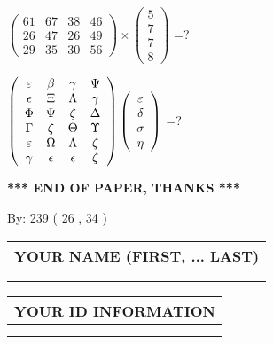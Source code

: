 \documentclass[12pt]{article}
\begin{document}
  
 
$ \left( \begin{array}{ccccccccc}
 61  & 
 67  & 
 38  & 
 46  \\ 
 26  & 
 47  & 
 26  & 
 49  \\ 
 29  & 
 35  & 
 30  & 
 56
\end{array}\right) \times
\left( \begin{array}{c}
 5  \\ 
 7  \\ 
 7  \\ 
 8
\end{array}\right) $ =?
 
 
$  %
 \left( \begin{array}
 {
 c
 c
 c
 c
 }
 \varepsilon & 
 \beta & 
 \gamma & 
 \Psi \\ 
 \epsilon & 
                    \Xi & 
 \Lambda & 
 \gamma \\ 
 \Phi & 
 \Psi & 
                    \zeta & 
 \Delta \\ 
 \Gamma & 
                    \zeta & 
 \Theta & 
 \Upsilon \\ 
 \varepsilon & 
 \Omega & 
 \Lambda & 
                    \zeta \\ 
 \gamma & 
 \epsilon & 
 \epsilon & 
                    \zeta
 \end{array} \right)
 \left( \begin{array}
 {
 c
 }
 \varepsilon \\ 
 \delta \\ 
 \sigma \\ 
 \eta
 \end{array} \right)
$ =?
 

 

 
\vspace{0.3in}
   
   
 \vspace{0.2in}
 
   
   
   
   
\vspace{1.0in} 
{\textbf{\large{ *** END OF PAPER, THANKS *** }}} 
   
   
\hspace{1.0in} By: 
 239 ( 26 ,  34 )
   
   
   
   
\newpage 
\setcounter{page}{ 
    27001 } 
   
   
   
   
\noindent\begin{tabular}{|l|}
\hline
YOUR NAME (FIRST, ... LAST)  \\
\hline
 \\ 
 \\ 
\hline
\end{tabular}
\hspace{0.05in} \begin{tabular}{|l|}
\hline
 YOUR   ID   INFORMATION  \\
\hline
 \\ 
 \\ 
\hline
\end{tabular}
   
\end{document}
